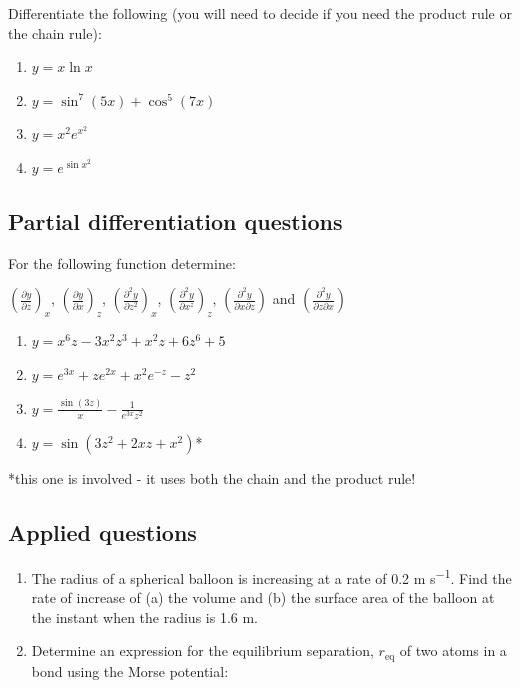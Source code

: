 \documentclass[
]{book}
\providecommand{\tightlist}{%
  \setlength{\itemsep}{0pt}\setlength{\parskip}{0pt}}
\begin{document}
Differentiate the following (you will need to decide if you need the product rule or the chain rule):

\begin{enumerate}
\def\labelenumi{\arabic{enumi}.}
\tightlist
\item
  \(y = x \ln x\)
\item
  \(y = \sin ^7 (5x)+ \cos ^5 (7x)\)
\item
  \(y = x^2 e^{x^2}\)
\item
  \(y = e^{\sin x^2}\)
\end{enumerate}

\hypertarget{partial-differentiation-questions}{%
\subsection{Partial differentiation questions}\label{partial-differentiation-questions}}

For the following function determine:

\(\left(\frac{\partial y}{\partial z}\right)_x\), \(\left(\frac{\partial y}{\partial x}\right)_z\), \(\left(\frac{\partial^2 y}{\partial z^2}\right)_x\), \(\left(\frac{\partial^2 y}{\partial x^z}\right)_z\), \(\left(\frac{\partial^2 y}{\partial x \partial z}\right)\) and \(\left(\frac{\partial^2 y}{\partial z \partial x}\right)\)

\begin{enumerate}
\def\labelenumi{\arabic{enumi}.}
\tightlist
\item
  \(y = x^6z -3x^2z^3+x^2z+6z^6+5\)
\item
  \(y = e^{3x}+ze^{2x}+x^2e^{-z}-z^2\)
\item
  \(y=\frac{\sin (3z)}{x}-\frac{1}{e^{3x}z^2}\)
\item
  \(y=\sin(3z^2+2xz+x^2)\)*
\end{enumerate}

*this one is involved - it uses both the chain and the product rule!

\hypertarget{applied-questions-2}{%
\subsection{Applied questions}\label{applied-questions-2}}

\begin{enumerate}
\def\labelenumi{\arabic{enumi}.}
\item
  The radius of a spherical balloon is increasing at a rate of 0.2 m s\textsuperscript{−1}. Find the rate of increase of (a) the volume and (b) the surface area of the balloon at the instant when the radius is 1.6 m.
\item
  Determine an expression for the equilibrium separation, \(r_{\textrm{eq}}\) of two atoms in a bond using the Morse potential:
\end{enumerate}
\end{document}
